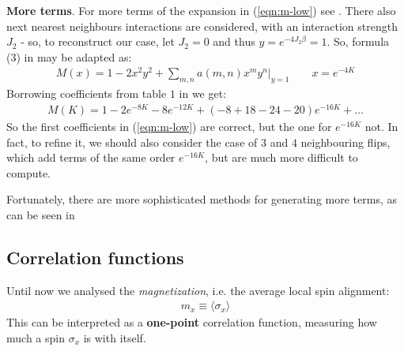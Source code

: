 \documentclass[../template.tex]{subfiles}
\begin{document}
\begin{appr}\textbf{More terms}. For more terms of the expansion in (\ref{eqn:m-low}) see \cite{low-exp}. There also next nearest neighbours interactions are considered, with an interaction strength $J_2$ - so, to reconstruct our case, let $J_2 = 0$ and thus $y = e^{-4J_2 \beta} = 1$. So, formula (3) in \cite{low-exp} may be adapted as:
    \begin{align*}
        M(x) = 1-2x^2 y^2 + \sum_{m,n} a(m,n) x^m y^n \Big|_{y=1} \qquad x=e^{-4K}
    \end{align*}
    Borrowing coefficients from table $1$ in \cite{low-exp} we get:
    \begin{align*}
        M(K) = 1 - 2 e^{-8K} -8 e^{-12K} + (-8+ 18-24-20) e^{-16K} + \dots
    \end{align*}
    So the first coefficients in (\ref{eqn:m-low}) are correct, but the one for $e^{-16K}$ not. In fact, to refine it, we should also consider the case of $3$ and $4$ neighbouring flips, which add terms of the same order $e^{-16K}$, but are much more difficult to compute.

    \medskip

    Fortunately, there are more sophisticated methods for generating more terms, as can be seen in \cite{ising-low}
\end{appr}

\subsection{Correlation functions}
Until now we analysed the \textit{magnetization}, i.e. the average local spin alignment:
\begin{align*}
    m_x \equiv \langle \sigma_x \rangle
\end{align*} 
This can be interpreted as a \textbf{one-point} correlation function, measuring how much a spin $\sigma_x$ is  with itself.
\end{document}
